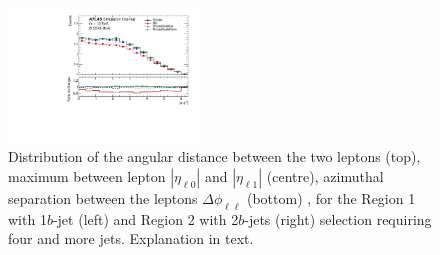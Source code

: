\begin{figure}[!htb]
\includegraphics[width=0.45\textwidth]{Plots/ttV/generator/c_Region_1_lep_dPhi} 
  \caption{Distribution of the angular distance between the two leptons (top), maximum between lepton $|\eta_{\ell 0}|$ and $|\eta_{\ell 1}|$ (centre), azimuthal separation between the leptons $\Delta \phi _{\ell \ell }$ (bottom) , for the Region 1 with 1$b$-jet (left) and Region 2 with 2$b$-jets (right) selection requiring four and more jets. Explanation in text.
   \label{ttV:ll_kin}}
\end{figure}
% 



